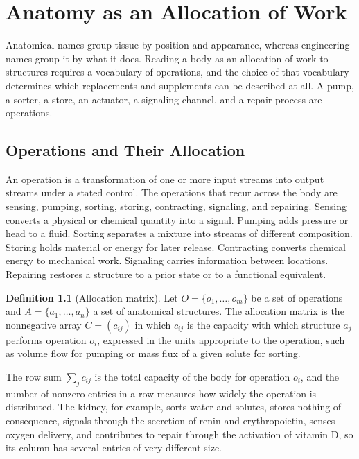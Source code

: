 \documentclass[11pt,openany]{book}
\theoremstyle{definition}
\newtheorem{definition}{Definition}[chapter]
\theoremstyle{remark}
\begin{document}
\chapter{Anatomy as an Allocation of Work}
\label{ch:allocation}

Anatomical names group tissue by position and appearance, whereas engineering names group it by what it does. Reading a body as an allocation of work to structures requires a vocabulary of operations, and the choice of that vocabulary determines which replacements and supplements can be described at all. A pump, a sorter, a store, an actuator, a signaling channel, and a repair process are operations.

\section{Operations and Their Allocation}

An operation is a transformation of one or more input streams into output streams under a stated control. The operations that recur across the body are sensing, pumping, sorting, storing, contracting, signaling, and repairing. Sensing converts a physical or chemical quantity into a signal. Pumping adds pressure or head to a fluid. Sorting separates a mixture into streams of different composition. Storing holds material or energy for later release. Contracting converts chemical energy to mechanical work. Signaling carries information between locations. Repairing restores a structure to a prior state or to a functional equivalent.

\begin{definition}[Allocation matrix]
Let $O=\{o_1,\dots,o_m\}$ be a set of operations and $A=\{a_1,\dots,a_n\}$ a set of anatomical structures. The allocation matrix is the nonnegative array $C=(c_{ij})$ in which $c_{ij}$ is the capacity with which structure $a_j$ performs operation $o_i$, expressed in the units appropriate to the operation, such as volume flow for pumping or mass flux of a given solute for sorting.
\end{definition}

The row sum $\sum_j c_{ij}$ is the total capacity of the body for operation $o_i$, and the number of nonzero entries in a row measures how widely the operation is distributed. The kidney, for example, sorts water and solutes, stores nothing of consequence, signals through the secretion of renin and erythropoietin, senses oxygen delivery, and contributes to repair through the activation of vitamin D, so its column has several entries of very different size.
\end{document}
